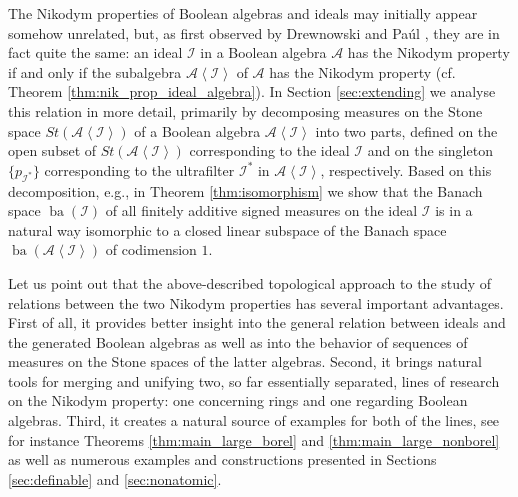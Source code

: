 \documentclass[a4paper,11pt,fleqn]{amsart}
\theoremstyle{definition}
\theoremstyle{remark}
\numberwithin{equation}{section}
\newcommand{\aA}{\mathcal{A}}
\newcommand{\iI}{\mathcal{I}}
\DeclareMathOperator{\ba}{ba}
\newcommand{\gen}[1]{\mathopen{}\left\langle#1\mathclose{}\right\rangle}
\begin{document}
The Nikodym properties of Boolean algebras and ideals may initially appear somehow unrelated, but, as first observed by Drewnowski and Pa\'ul \cite[Remark 2.2.(a)]{DP00}, they are in fact quite the same: an ideal $\iI$ in a Boolean algebra $\aA$ has the Nikodym property if and only if the subalgebra $\aA\gen{\iI}$ of $\aA$ has the Nikodym property (cf. Theorem \ref{thm:nik_prop_ideal_algebra}). In Section \ref{sec:extending} we analyse this relation in more detail, primarily by decomposing measures on the Stone space $St(\aA\gen{\iI})$ of a Boolean algebra $\aA\gen{\iI}$ into two parts, defined on the open subset of $St(\aA\gen{\iI})$ corresponding to the ideal $\iI$ and on the singleton $\big\{p_{\iI^*}\big\}$ corresponding to the ultrafilter $\iI^*$ in $\aA\gen{\iI}$, respectively. Based on this decomposition, e.g., in Theorem \ref{thm:isomorphism} we show that the Banach space $\ba(\iI)$ of all finitely additive signed measures on the ideal $\iI$ is in a natural way isomorphic to a closed linear subspace of the Banach space $\ba(\aA\gen{\iI})$ of codimension $1$.

Let us point out that the above-described topological approach to the study of relations between the two Nikodym properties has several important advantages. First of all, it provides better insight into the general relation between ideals and the generated Boolean algebras as well as into the behavior of sequences of measures on the Stone spaces of the latter algebras. Second, it brings natural tools for merging and unifying two, so far essentially separated, lines of research on the Nikodym property: one concerning rings and one regarding Boolean algebras. Third, it creates a natural source of examples for both of the lines, see for instance Theorems \ref{thm:main_large_borel} and \ref{thm:main_large_nonborel} as well as numerous examples and constructions presented in Sections \ref{sec:definable} and \ref{sec:nonatomic}.

\medskip
\end{document}
